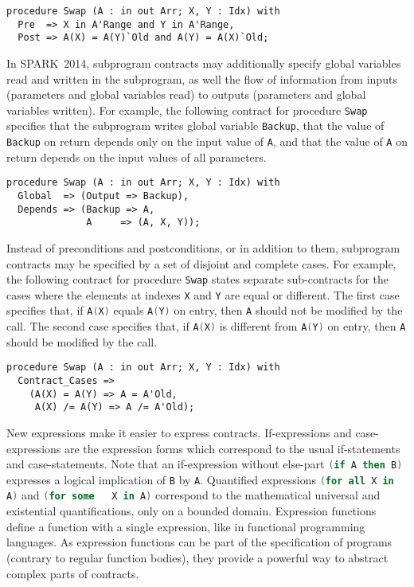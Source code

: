\documentclass[10pt,a4paper,twocolumn]{article}
\newcommand{\newspark}{SPARK~2014\xspace}
\newcommand{\SPARK}[1]{\lstinline[language=Ada,basicstyle={\footnotesize
      \sffamily},framesep=0pt]$#1$}
\begin{document}
\begin{lstlisting}
procedure Swap (A : in out Arr; X, Y : Idx) with
  Pre  => X in A'Range and Y in A'Range,
  Post => A(X) = A(Y)`Old and A(Y) = A(X)`Old;
\end{lstlisting}

In \newspark, subprogram contracts may additionally specify global variables
read and written in the subprogram, as well the flow of information from inputs
(parameters and global variables read) to outputs (parameters and global
variables written). For example, the following contract for procedure
\SPARK{Swap} specifies that the subprogram writes global variable
\SPARK{Backup}, that the value of \SPARK{Backup} on return depends only on the
input value of \SPARK{A}, and that the value of \SPARK{A} on return depends on
the input values of all parameters.

\begin{lstlisting}
procedure Swap (A : in out Arr; X, Y : Idx) with
  Global  => (Output => Backup),
  Depends => (Backup => A,
              A     => (A, X, Y));
\end{lstlisting}

Instead of preconditions and postconditions, or in addition to them, subprogram
contracts may be specified by a set of disjoint and complete cases. For
example, the following contract for procedure \SPARK{Swap} states separate
sub-contracts for the cases where the elements at indexes \SPARK{X} and
\SPARK{Y} are equal or different. The first case specifies that, if
\SPARK{A(X)} equals \SPARK{A(Y)} on entry, then \SPARK{A} should not be
modified by the call. The second case specifies that, if \SPARK{A(X)} is
different from \SPARK{A(Y)} on entry, then \SPARK{A} should be modified by the
call.

\begin{lstlisting}
procedure Swap (A : in out Arr; X, Y : Idx) with
  Contract_Cases =>
    (A(X) = A(Y) => A = A'Old,
     A(X) /= A(Y) => A /= A'Old);
\end{lstlisting}

New expressions make it easier to express contracts. If-expressions and
case-expressions are the expression forms which correspond to the usual
if-statements and case-statements. Note that an if-expression without else-part
\SPARK{(if A then B)} expresses a logical implication of \SPARK{B} by
\SPARK{A}. Quantified expressions \SPARK{(for all X in A)} and \SPARK{(for some
  X in A)} correspond to the mathematical universal and existential
quantifications, only on a bounded domain. Expression functions define a
function with a single expression, like in functional programming languages. As
expression functions can be part of the specification of programs (contrary to
regular function bodies), they provide a powerful way to abstract complex parts
of contracts.
\end{document}
